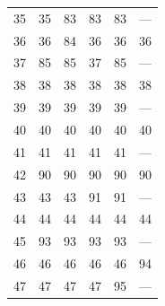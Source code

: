 \begin{longtable}{r|rrrrr}
35 & 35 & 83 & 83 & 83 & ---\\
36 & 36 & 84 & 36 & 36 & 36\\
37 & 85 & 85 & 37 & 85 & ---\\
38 & 38 & 38 & 38 & 38 & 38\\
39 & 39 & 39 & 39 & 39 & ---\\
40 & 40 & 40 & 40 & 40 & 40\\
41 & 41 & 41 & 41 & 41 & ---\\
42 & 90 & 90 & 90 & 90 & 90\\
43 & 43 & 43 & 91 & 91 & ---\\
44 & 44 & 44 & 44 & 44 & 44\\
45 & 93 & 93 & 93 & 93 & ---\\
46 & 46 & 46 & 46 & 46 & 94\\
47 & 47 & 47 & 47 & 95 & ---\\
\end{longtable}
